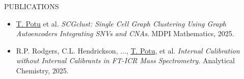 \documentclass{resume} %
\begin{document}
\begin{rSection}{PUBLICATIONS}
\begin{itemize}
\item \underline{T. Potu} et al. \textit{SCGclust: Single Cell Graph Clustering Using Graph Autoencoders Integrating SNVs and CNAs}. MDPI Mathematics, 2025.
\item R.P. Rodgers, C.L. Hendrickson, ..., \underline{T. Potu}, et al. \textit{Internal Calibration without Internal Calibrants in FT-ICR Mass Spectrometry}. Analytical Chemistry, 2025.
\end{itemize}
\end{rSection}
\end{document}

